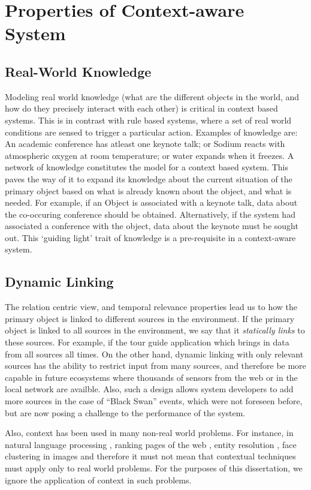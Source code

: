\section{Properties of Context-aware System}

\subsection{Real-World Knowledge}
Modeling real world knowledge (what are the different objects in the world, and how do they precisely interact with each other) is critical in context based systems. This is in contrast with rule based systems, where a set of real world conditions are sensed to trigger a particular action. Examples of knowledge are: An academic conference has atleast one keynote talk; or Sodium reacts with atmospheric oxygen at room temperature; or water expands when it freezes. A network of knowledge constitutes the model for a context based system. This paves the way of it to expand its knowledge about the current situation of the primary object based on what is already known about the object, and what is needed. For example, if an Object is associated with a keynote talk, data about the co-occuring conference should be obtained. Alternatively, if the system had associated a conference with the object, data about the keynote must be sought out. This `guiding light' trait of knowledge is a pre-requisite in a context-aware system.

\subsection{Dynamic Linking}
The relation centric view, and temporal relevance properties lead us to how the primary object is linked to different sources in the environment. If the primary object is linked to all sources in the environment, we say that it \textit{statically links} to these sources. For example, if the tour guide application which brings in data from all sources all times. On the other hand, dynamic linking with only relevant sources has the ability to restrict input from many sources, and therefore be more capable in future ecosystems where thousands of sensors from the web or in the local network are availble. Also, such a design allows system developers to add more sources in the case of ``Black Swan'' events, which were not foreseen before, but are now posing a challenge to the performance of the system.

Also, context has been used in many non-real world problems. For instance, in natural language processing \cite{lee1990context}, ranking pages of the web \cite{page1999pagerank}, entity resolution \cite{chen2009exploiting}, face clustering in images \cite{zhang2013unified} and therefore it must not mean that contextual techniques must apply only to real world problems. For the purposes of this dissertation, we ignore the application of context in such problems.

